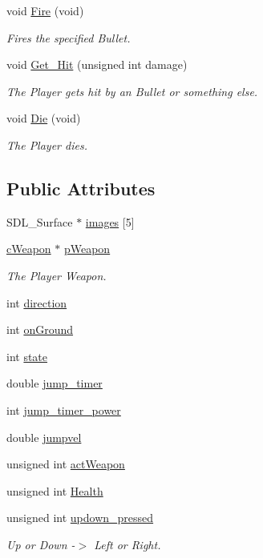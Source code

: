 \begin{DoxyCompactItemize}
void \hyperlink{classc_player_a5570d4174984f060a5d6bc54483cf49b}{Fire} (void)
\begin{DoxyCompactList}\small\item\em Fires the specified Bullet. \end{DoxyCompactList}\item 
void \hyperlink{classc_player_a6382e80921f8bc28a3d29a61a28b763b}{Get\-\_\-\-Hit} (unsigned int damage)
\begin{DoxyCompactList}\small\item\em The Player gets hit by an Bullet or something else. \end{DoxyCompactList}\item 
void \hyperlink{classc_player_a03d8200d3deac5b5ba78ca3898e31945}{Die} (void)
\begin{DoxyCompactList}\small\item\em The Player dies. \end{DoxyCompactList}\end{DoxyCompactItemize}
\subsection*{Public Attributes}
\begin{DoxyCompactItemize}
\item 
S\-D\-L\-\_\-\-Surface $\ast$ \hyperlink{classc_player_a67c4d2933cc64e70d5733f2fae7140d9}{images} \mbox{[}5\mbox{]}
\item 
\hyperlink{classc_weapon}{c\-Weapon} $\ast$ \hyperlink{classc_player_a9a423c004d02e40cd589be2bcdcb5fc3}{p\-Weapon}
\begin{DoxyCompactList}\small\item\em The Player Weapon. \end{DoxyCompactList}\item 
int \hyperlink{classc_player_abba8ad20d8e5b5d712b32bb45d6f1f5a}{direction}
\item 
int \hyperlink{classc_player_a03db459aeafd05f9c9b8e90550336b42}{on\-Ground}
\item 
int \hyperlink{classc_player_a770b16e87c30e5ae205af92038fac0f9}{state}
\item 
double \hyperlink{classc_player_ae58956b3a1628bc541ef8d1b017a8ef4}{jump\-\_\-timer}
\item 
int \hyperlink{classc_player_a7dfbe4472d1fd2eeb1949a13981885a7}{jump\-\_\-timer\-\_\-power}
\item 
double \hyperlink{classc_player_a21af56625d269858e77fc61bc042cceb}{jumpvel}
\item 
unsigned int \hyperlink{classc_player_a45a1365e8ef93b1636fb6c2d714635a7}{act\-Weapon}
\item 
unsigned int \hyperlink{classc_player_a54d7325c55feb234dfe3550cf70da559}{Health}
\item 
unsigned int \hyperlink{classc_player_ac2cb468d98391a6b9fbaa6db2e103a2d}{updown\-\_\-pressed}
\begin{DoxyCompactList}\small\item\em Up or Down -\/$>$ Left or Right. \end{DoxyCompactList}\end{DoxyCompactItemize}


